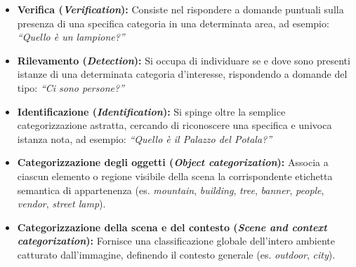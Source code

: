 ﻿\documentclass[11pt, a4paper]{article}
\begin{document}
\begin{itemize}
    \item \textbf{Verifica (\emph{Verification}):} Consiste nel rispondere a domande puntuali sulla presenza di una specifica categoria in una determinata area, ad esempio: \emph{``Quello è un lampione?''}


    \item \textbf{Rilevamento (\emph{Detection}):} Si occupa di individuare se e dove sono presenti istanze di una determinata categoria d'interesse, rispondendo a domande del tipo: \emph{``Ci sono persone?''}


    \item \textbf{Identificazione (\emph{Identification}):} Si spinge oltre la semplice categorizzazione astratta, cercando di riconoscere una specifica e univoca istanza nota, ad esempio: \emph{``Quello è il Palazzo del Potala?''}


    \item \textbf{Categorizzazione degli oggetti (\emph{Object categorization}):} Associa a ciascun elemento o regione visibile della scena la corrispondente etichetta semantica di appartenenza (es. \emph{mountain}, \emph{building}, \emph{tree}, \emph{banner}, \emph{people}, \emph{vendor}, \emph{street lamp}).


    \item \textbf{Categorizzazione della scena e del contesto (\emph{Scene and context categorization}):} Fornisce una classificazione globale dell'intero ambiente catturato dall'immagine, definendo il contesto generale (es. \emph{outdoor}, \emph{city}).

\end{itemize}
\end{document}
